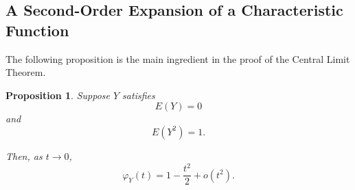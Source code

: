 \documentclass[11pt]{article}
\theoremstyle{definition}
\theoremstyle{plain}
\newtheorem{proposition}{Proposition}
\theoremstyle{remark}
\begin{document}
\subsection*{A Second-Order Expansion of a Characteristic Function}

The following proposition is the main ingredient in the proof of the
Central Limit Theorem.

\begin{proposition}
\label{prop:cf-expansion}
Suppose $Y$ satisfies
\[
E(Y)=0
\]
and
\[
E(Y^2)=1.
\]

Then, as $t\to0$,
\[
\varphi_Y(t)
=
1-\frac{t^2}{2}+o(t^2).
\]
\end{proposition}
\end{document}
